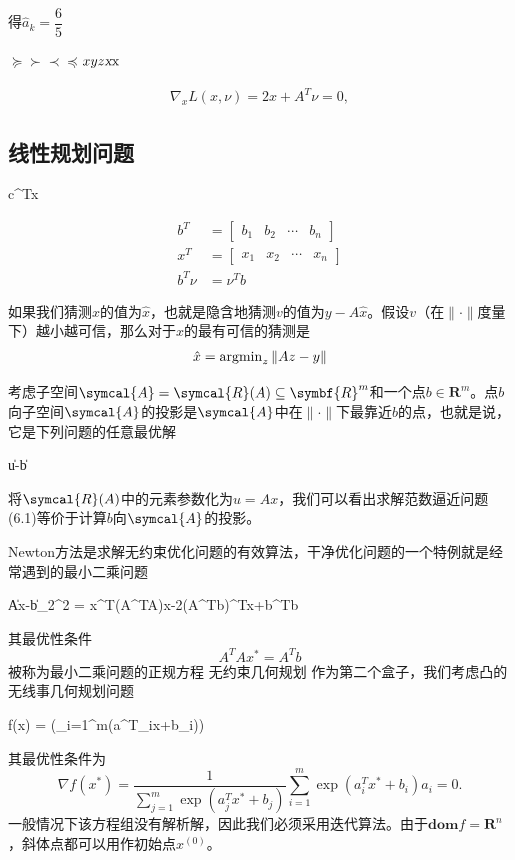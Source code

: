 \documentclass{lsbook}
\begin{document}
得$\hat{a}_k=\dfrac{6}{5}$

$\succeq\succ\prec\preceq$$xyz\textsl{x}\text{x}$

\begin{align*}
\nabla_xL(x,\nu) = 2x + A^T\nu = 0,
\end{align*}
\subsection{线性规划问题}
\begin{mini}[2]
	{}{c^Tx}
	{\label{eq:Ex1}}{}
\end{mini}

\begin{align*}
b^T &= \begin{bmatrix}
b_1 & b_2 & \cdots & b_n
\end{bmatrix}\\
x^T &= \begin{bmatrix}
x_1 & x_2 & \cdots & x_n
\end{bmatrix}\\
b^T\nu &= \nu^Tb
\end{align*}

如果我们猜测$x$的值为$\hat{x}$，也就是隐含地猜测$v$的值为$y-A\hat{x}$。假设$v$（在$\|\cdot\|$度量下）越小越可信，那么对于$x$的最有可信的猜测是
\begin{align}
\hat{x} = \operatorname{argmin}_z	\|Az - y\|
\end{align}

考虑子空间$\symcal{A} = \symcal{R}(A)\subseteq\symbf{R}^m$和一个点$b\in\symbf{R}^m$。点$b$向子空间$\symcal{A}$的\textsf{投影}是$\symcal{A}$中在$\|\cdot\|$下最靠近$b$的点，也就是说，它是下列问题的任意最优解
\begin{mini}[2]
	{}{\|u-b\|}
	{\label{eq:Ex1}}{}
\end{mini}
将$\symcal{R}(A)$中的元素参数化为$u=Ax$，我们可以看出求解范数逼近问题(6.1)等价于计算$b$向$\symcal{A}$的投影。

Newton方法是求解无约束优化问题的有效算法，干净优化问题的一个特例就是经常遇到的最小二乘问题
\begin{mini}[2]
	{}{\|Ax-b\|_2^2 = x^T(A^TA)x-2(A^Tb)^Tx+b^Tb}
	{\label{eq:Ex2}}{}
\end{mini}
其最优性条件
\[
A^TAx^\ast = A^Tb
\]
被称为最小二乘问题的\textsf{正规方程}
\mbox{无约束几何规划}
作为第二个盒子，我们考虑凸的无线事几何规划问题
\begin{mini}[2]
	{}{f(x) = \log \left(\sum_{i=1}^{m}\exp(a^T_ix+b_i)\right)}
	{\label{eq:Ex2}}{}
\end{mini}
其最优性条件为
\[
\nabla f(x^\ast) = \frac{1}{\sum\limits_{j=1}^m\exp(a^T_jx^\ast + b_j)}\sum_{i=1}^{m}\exp(a^T_ix^\ast+b_i)a_i=0.
\]
一般情况下该方程组没有解析解，因此我们必须采用迭代算法。由于$\symbf{dom}f=\symbf{R}^n$，斜体点都可以用作初始点$x^{(0)}$。
\end{document}
